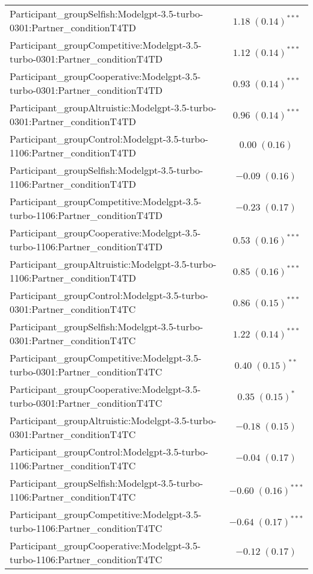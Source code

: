 \begin{table}
\begin{center}
\begin{small}
\begin{tabular}{l c}
Participant\_groupSelfish:Modelgpt-3.5-turbo-0301:Partner\_conditionT4TD     & $1.18 \; (0.14)^{***}$  \\
Participant\_groupCompetitive:Modelgpt-3.5-turbo-0301:Partner\_conditionT4TD & $1.12 \; (0.14)^{***}$  \\
Participant\_groupCooperative:Modelgpt-3.5-turbo-0301:Partner\_conditionT4TD & $0.93 \; (0.14)^{***}$  \\
Participant\_groupAltruistic:Modelgpt-3.5-turbo-0301:Partner\_conditionT4TD  & $0.96 \; (0.14)^{***}$  \\
Participant\_groupControl:Modelgpt-3.5-turbo-1106:Partner\_conditionT4TD     & $0.00 \; (0.16)$        \\
Participant\_groupSelfish:Modelgpt-3.5-turbo-1106:Partner\_conditionT4TD     & $-0.09 \; (0.16)$       \\
Participant\_groupCompetitive:Modelgpt-3.5-turbo-1106:Partner\_conditionT4TD & $-0.23 \; (0.17)$       \\
Participant\_groupCooperative:Modelgpt-3.5-turbo-1106:Partner\_conditionT4TD & $0.53 \; (0.16)^{***}$  \\
Participant\_groupAltruistic:Modelgpt-3.5-turbo-1106:Partner\_conditionT4TD  & $0.85 \; (0.16)^{***}$  \\
Participant\_groupControl:Modelgpt-3.5-turbo-0301:Partner\_conditionT4TC     & $0.86 \; (0.15)^{***}$  \\
Participant\_groupSelfish:Modelgpt-3.5-turbo-0301:Partner\_conditionT4TC     & $1.22 \; (0.14)^{***}$  \\
Participant\_groupCompetitive:Modelgpt-3.5-turbo-0301:Partner\_conditionT4TC & $0.40 \; (0.15)^{**}$   \\
Participant\_groupCooperative:Modelgpt-3.5-turbo-0301:Partner\_conditionT4TC & $0.35 \; (0.15)^{*}$    \\
Participant\_groupAltruistic:Modelgpt-3.5-turbo-0301:Partner\_conditionT4TC  & $-0.18 \; (0.15)$       \\
Participant\_groupControl:Modelgpt-3.5-turbo-1106:Partner\_conditionT4TC     & $-0.04 \; (0.17)$       \\
Participant\_groupSelfish:Modelgpt-3.5-turbo-1106:Partner\_conditionT4TC     & $-0.60 \; (0.16)^{***}$ \\
Participant\_groupCompetitive:Modelgpt-3.5-turbo-1106:Partner\_conditionT4TC & $-0.64 \; (0.17)^{***}$ \\
Participant\_groupCooperative:Modelgpt-3.5-turbo-1106:Partner\_conditionT4TC & $-0.12 \; (0.17)$       \\

\end{tabular}
\end{small}
\end{center}
\end{table}
